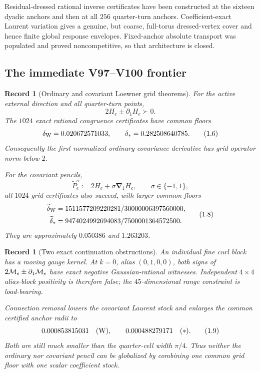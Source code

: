 \documentclass[11pt,oneside]{article}
\newtheorem{record}[theorem]{Record}
\theoremstyle{definition}
\theoremstyle{remark}
\begin{document}
Residual-dressed rational inverse certificates have been constructed
at the sixteen dyadic anchors and then at all \(256\) quarter-turn
anchors.  Coefficient-exact Laurent variation gives a genuine, but
coarse, full-torus dressed-vertex cover and hence finite global
response envelopes.  Fixed-anchor absolute transport was populated
and proved noncompetitive, so that architecture is closed.

\subsection{The immediate V97--V100 frontier}

\begin{record}[Ordinary and covariant Loewner grid theorems]
\label{rec:newv1-loewner}
For the active external direction and all quarter-turn points,
\[
 2H_e\pm\partial_1H_e\succ0.                               \tag{1.5}
\]
The \(1024\) exact rational congruence certificates have common
floors
\[
 \delta_{\rm W}=0.020672571033,\qquad
 \delta_*=0.282508640785.                                  \tag{1.6}
\]
Consequently the first normalized ordinary covariance derivative
has grid operator norm below \(2\).

For the covariant pencils,
\[
 \widetilde P_e^\sigma
 :=2H_e+\sigma{\boldsymbol\nabla}_1H_e,\qquad
 \sigma\in\{-1,1\},                                       \tag{1.7}
\]
all \(1024\) grid certificates also succeed, with larger common
floors
\[
\begin{split}
\widetilde\delta_{\rm W}
 &=1511577209220281/30000006397560000,\\
\widetilde\delta_*
 &=9474024992694083/7500001364572500.
\end{split}                                                 \tag{1.8}
\]
They are approximately \(0.050386\) and \(1.263203\).
\end{record}

\begin{record}[Two exact continuation obstructions]
\label{rec:newv1-latest-nogos}
An individual fine curl block has a moving gauge kernel.  At
\(k=0\), alias \((0,1,0,0)\), both signs of
\(2{\cal M}_e\pm\partial_1{\cal M}_e\) have exact negative
Gaussian-rational witnesses.  Independent \(4\times4\) alias-block
positivity is therefore false; the \(45\)-dimensional range
constraint is load-bearing.

Connection removal lowers the covariant Laurent stock and enlarges
the common certified anchor radii to
\[
 0.000853815031\quad({\rm W}),\qquad
 0.000488279171\quad(*).                                   \tag{1.9}
\]
Both are still much smaller than the quarter-cell width \(\pi/4\).
Thus neither the ordinary nor covariant pencil can be globalized by
combining one common grid floor with one scalar coefficient stock.
\end{record}
\end{document}
